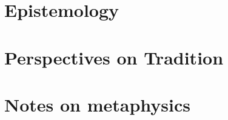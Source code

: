 \documentclass[a4paper,12pt,twoside]{book}
\begin{document}
\chapter{Epistemology}









\chapter{Perspectives on Tradition}






\chapter{Notes on metaphysics}



\end{document}
